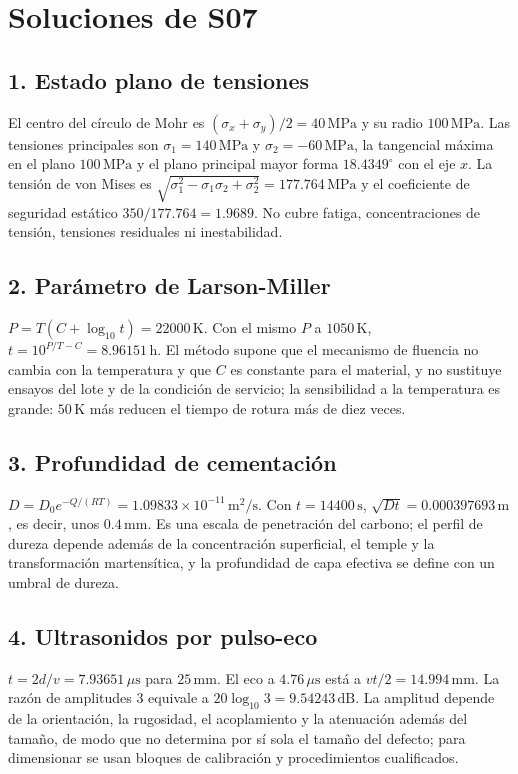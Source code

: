 \chapter{Soluciones de S07}
\section{1. Estado plano de tensiones}
El centro del círculo de Mohr es $(\sigma_x+\sigma_y)/2=40\,\mathrm{MPa}$ y su radio $100\,\mathrm{MPa}$. Las tensiones principales son $\sigma_1=140\,\mathrm{MPa}$ y $\sigma_2=-60\,\mathrm{MPa}$, la tangencial máxima en el plano $100\,\mathrm{MPa}$ y el plano principal mayor forma $18.4349^\circ$ con el eje $x$. La tensión de von Mises es $\sqrt{\sigma_1^2-\sigma_1\sigma_2+\sigma_2^2}=177.764\,\mathrm{MPa}$ y el coeficiente de seguridad estático $350/177.764=1.9689$. No cubre fatiga, concentraciones de tensión, tensiones residuales ni inestabilidad.

\section{2. Parámetro de Larson-Miller}
$P=T(C+\log_{10}t)=22000\,\mathrm K$. Con el mismo $P$ a $1050\,\mathrm K$, $t=10^{P/T-C}=8.96151\,\mathrm h$. El método supone que el mecanismo de fluencia no cambia con la temperatura y que $C$ es constante para el material, y no sustituye ensayos del lote y de la condición de servicio; la sensibilidad a la temperatura es grande: $50\,\mathrm K$ más reducen el tiempo de rotura más de diez veces.

\section{3. Profundidad de cementación}
$D=D_0e^{-Q/(RT)}=1.09833\times10^{-11}\,\mathrm{m^2/s}$. Con $t=14400\,\mathrm s$, $\sqrt{Dt}=0.000397693\,\mathrm m$, es decir, unos $0.4\,\mathrm{mm}$. Es una escala de penetración del carbono; el perfil de dureza depende además de la concentración superficial, el temple y la transformación martensítica, y la profundidad de capa efectiva se define con un umbral de dureza.

\section{4. Ultrasonidos por pulso-eco}
$t=2d/v=7.93651\,\mu\mathrm s$ para $25\,\mathrm{mm}$. El eco a $4.76\,\mu\mathrm s$ está a $vt/2=14.994\,\mathrm{mm}$. La razón de amplitudes 3 equivale a $20\log_{10}3=9.54243\,\mathrm{dB}$. La amplitud depende de la orientación, la rugosidad, el acoplamiento y la atenuación además del tamaño, de modo que no determina por sí sola el tamaño del defecto; para dimensionar se usan bloques de calibración y procedimientos cualificados.


